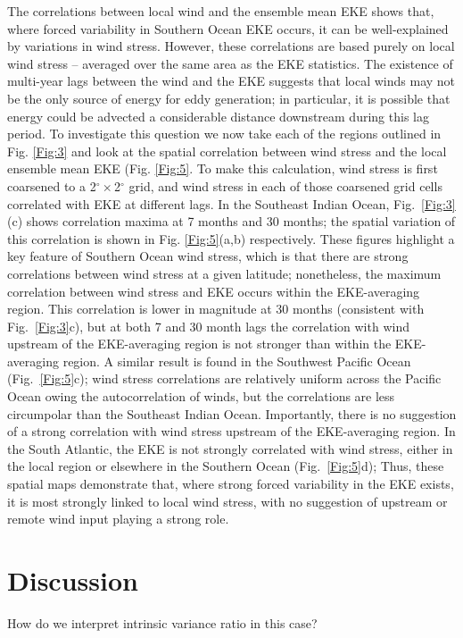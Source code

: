 \documentclass{agujournal2019}
\begin{document}
The correlations between local wind and the ensemble mean EKE shows that, where forced variability in Southern Ocean EKE occurs, it can be well-explained by variations in wind stress.
However, these correlations are based purely on local wind stress -- averaged over the same area as the EKE statistics.
The existence of multi-year lags between the wind and the EKE suggests that local winds may not be the only source of energy for eddy generation; in particular, it is possible that energy could be advected a considerable distance downstream during this lag period.
To investigate this question we now take each of the regions outlined in Fig. \ref{Fig:3} and look at the spatial correlation between wind stress and the local ensemble mean EKE (Fig. \ref{Fig:5}.
To make this calculation, wind stress is first coarsened to a 2$^\circ \times $2$^\circ$ grid, and wind stress in each of those coarsened grid cells correlated with EKE at different lags.
In the Southeast Indian Ocean, Fig.~\ref{Fig:3}(c) shows correlation maxima at 7 months and 30 months; the spatial variation of this correlation is shown in Fig. \ref{Fig:5}(a,b) respectively.
These figures highlight a key feature of Southern Ocean wind stress, which is that there are strong correlations between wind stress at a given latitude; nonetheless, the maximum correlation between wind stress and EKE occurs within the EKE-averaging region.
This correlation is lower in magnitude at 30 months (consistent with Fig.~\ref{Fig:3}c), but at both 7 and 30 month lags the correlation with wind upstream of the EKE-averaging region is not stronger than within the EKE-averaging region.
A similar result is found in the Southwest Pacific Ocean (Fig.~\ref{Fig:5}c); wind stress correlations are relatively uniform across the Pacific Ocean owing the autocorrelation of winds, but the correlations are less circumpolar than the Southeast Indian Ocean.
Importantly, there is no suggestion of a strong correlation with wind stress upstream of the EKE-averaging region.
In the South Atlantic, the EKE is not strongly correlated with wind stress, either in the local region or elsewhere in the Southern Ocean (Fig.~\ref{Fig:5}d);
Thus, these spatial maps demonstrate that, where strong forced variability in the EKE exists, it is most strongly linked to local wind stress, with no suggestion of upstream or remote wind input playing a strong role. 

\section{Discussion}
How do we interpret intrinsic variance ratio in this case?
\end{document}
